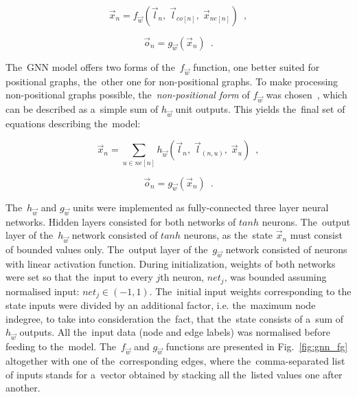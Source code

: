 \documentclass{llncs}
\begin{document}
\begin{equation}
\vec{x}_n = f_{\vec{w}}(\vec{l}_n, \; \vec{l}_{co[n]}, \; \vec{x}_{ne[n]}) \enspace ,
\label{eq:gnn_fmin}
\end{equation}

\begin{equation}
\vec{o}_n = g_{\vec{w}}(\vec{x}_n) \enspace .
\label{eq:gnn_gmin}
\end{equation}

The~GNN model offers two forms of the~$f_{\vec{w}}$ function, one better suited for positional graphs, the~other one for non-positional graphs. To make processing non-positional graphs possible, the~\emph{non-positional form} of $f_{\vec{w}}$ was chosen~\cite{scarselli2009graph}, which can be described as a~simple sum of $h_{\vec{w}}$ unit outputs. This yields the~final set of equations describing the~model:

\begin{equation}
\vec{x}_n = \sum_{u \in ne[n]}h_{\vec{w}}(\vec{l}_n, \; \vec{l}_{(n,u)}, \; \vec{x}_{u}) \enspace ,
\label{eq:gnn_ffinal}
\end{equation}

\begin{equation}
\vec{o}_n = g_{\vec{w}}(\vec{x}_n) \enspace .
\label{eq:gnn_gfinal}
\end{equation}

The~$h_{\vec{w}}$ and $g_{\vec{w}}$ units were implemented as fully-connected three layer neural networks. Hidden layers consisted for both networks of $tanh$ neurons. The~output layer of the~$h_{\vec{w}}$ network consisted of $tanh$ neurons, as the~state $\vec{x}_n$ must consist of bounded values only. The~output layer of the~$g_{\vec{w}}$ network consisted of neurons with linear activation function. During initialization, weights of both networks were set so that the~input to every $j$th neuron, $net_j$, was bounded assuming normalised input: $net_j \in (-1, 1)$. The~initial input weights corresponding to the state inputs were divided by an additional factor, i.e. the~maximum node indegree, to take into consideration the~fact, that the~state consists of a~sum of $h_{\vec{w}}$ outputs. All the~input data (node and edge labels) was normalised before feeding to the~model. The~$f_{\vec{w}}$ and $g_{\vec{w}}$ functions are presented in Fig.~\ref{fig:gnn_fg} altogether with one of the~corresponding edges, where the~comma-separated list of inputs stands for a~vector obtained by stacking all the~listed values one after another.
\end{document}
